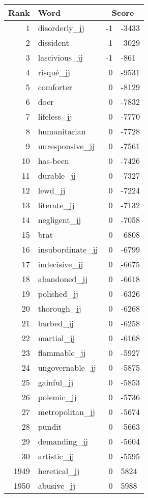 \begin{longtable}[!htbp]{| rlr@{.}l |}
    \hline
    \textbf{Rank} & \textbf{Word} & \multicolumn{2}{c|}{\textbf{Score}} \\
    \hline
    \endhead
    1 & disorderly\_jj & -1 & -3433 \\
    2 & dissident & -1 & -3029 \\
    3 & lascivious\_jj & -1 & -861 \\
    4 & risqué\_jj & 0 & -9531 \\
    5 & comforter & 0 & -8129 \\
    6 & doer & 0 & -7832 \\
    7 & lifeless\_jj & 0 & -7770 \\
    8 & humanitarian & 0 & -7728 \\
    9 & unresponsive\_jj & 0 & -7561 \\
    10 & has-been & 0 & -7426 \\
    11 & durable\_jj & 0 & -7327 \\
    12 & lewd\_jj & 0 & -7224 \\
    13 & literate\_jj & 0 & -7132 \\
    14 & negligent\_jj & 0 & -7058 \\
    15 & brat & 0 & -6808 \\
    16 & insubordinate\_jj & 0 & -6799 \\
    17 & indecisive\_jj & 0 & -6675 \\
    18 & abandoned\_jj & 0 & -6618 \\
    19 & polished\_jj & 0 & -6326 \\
    20 & thorough\_jj & 0 & -6268 \\
    21 & barbed\_jj & 0 & -6258 \\
    22 & martial\_jj & 0 & -6168 \\
    23 & flammable\_jj & 0 & -5927 \\
    24 & ungovernable\_jj & 0 & -5875 \\
    25 & gainful\_jj & 0 & -5853 \\
    26 & polemic\_jj & 0 & -5736 \\
    27 & metropolitan\_jj & 0 & -5674 \\
    28 & pundit & 0 & -5663 \\
    29 & demanding\_jj & 0 & -5604 \\
    30 & artistic\_jj & 0 & -5595 \\
    1949 & heretical\_jj & 0 & 5824 \\
    1950 & abusive\_jj & 0 & 5988 \\

\end{longtable}

